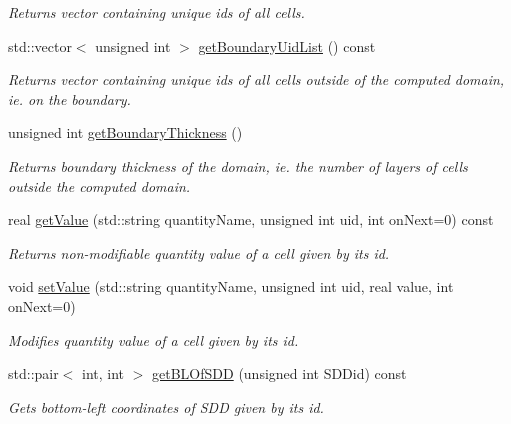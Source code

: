 \begin{DoxyCompactItemize}
\begin{DoxyCompactList}\small\item\em Returns vector containing unique ids of all cells. \item\end{DoxyCompactList}\item 
std::vector$<$ unsigned int $>$ \hyperlink{classDomain_a4d0296a4bb86c28b9896951cd1ada6e9}{getBoundaryUidList} () const 
\begin{DoxyCompactList}\small\item\em Returns vector containing unique ids of all cells outside of the computed domain, ie. on the boundary. \item\end{DoxyCompactList}\item 
unsigned int \hyperlink{classDomain_aa0d225e23c6a454058a3df5b7b5973fa}{getBoundaryThickness} ()
\begin{DoxyCompactList}\small\item\em Returns boundary thickness of the domain, ie. the number of layers of cells outside the computed domain. \item\end{DoxyCompactList}\item 
real \hyperlink{classDomain_a6023c81f9233bcc48ad6f315829e9725}{getValue} (std::string quantityName, unsigned int uid, int onNext=0) const 
\begin{DoxyCompactList}\small\item\em Returns non-\/modifiable quantity value of a cell given by its id. \item\end{DoxyCompactList}\item 
void \hyperlink{classDomain_a9319e738fbd4ada8145998d5392c9334}{setValue} (std::string quantityName, unsigned int uid, real value, int onNext=0)
\begin{DoxyCompactList}\small\item\em Modifies quantity value of a cell given by its id. \item\end{DoxyCompactList}\item 
std::pair$<$ int, int $>$ \hyperlink{classDomain_ab304fc5121bd34e817526fd2d4ccaa62}{getBLOfSDD} (unsigned int SDDid) const 
\begin{DoxyCompactList}\small\item\em Gets bottom-\/left coordinates of SDD given by its id. \item\end{DoxyCompactList}\item 

\end{DoxyCompactItemize}
